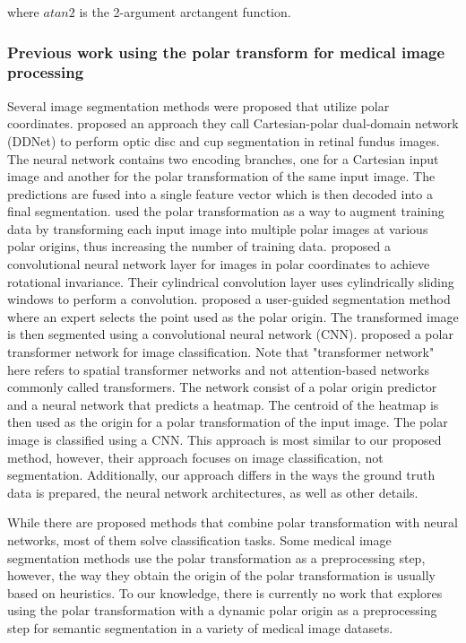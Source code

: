   where $atan2$ is the 2-argument arctangent function.

    \subsubsection{Previous work using the polar transform for medical image processing}
    
Several image segmentation methods were proposed that utilize polar coordinates. 
\citet{liuDDNetCartesianpolarDualdomain2019a} proposed an approach they
call Cartesian-polar dual-domain network (DDNet) to perform optic disc and cup segmentation
in retinal fundus images. The neural network contains two encoding branches, one for a Cartesian input image and another for the polar transformation of the same input image. The predictions are fused into a single feature vector which is then decoded into a final segmentation.
\citet{salehinejadImageAugmentationUsing2018} used the polar transformation as a way to 
augment
training data by transforming each input image into multiple polar images at various polar
origins, thus increasing the number of training data.
\citet{kimCyCNNRotationInvariant2020a} proposed a convolutional neural network layer for 
images in polar 
coordinates to achieve rotational invariance. Their cylindrical convolution layer uses cylindrically sliding windows to perform a convolution.
\citet{kimCNNBasedUGS2018} proposed a user-guided segmentation method where an expert 
selects the
point used as the polar origin. The transformed image is then
segmented using a convolutional neural network (CNN). 
\citet{estevesPolarTransformerNetworks2018a} proposed a polar transformer network for image 
classification. Note that "transformer network" here refers to spatial transformer networks 
\cite{jaderbergSpatialTransformerNetworks2016} and not attention-based networks commonly called 
transformers.
The network 
consist of a polar origin predictor and a neural network that predicts a heatmap. The centroid of the heatmap is then used as the origin for a polar transformation of the input image. The polar image is classified using a CNN. This approach is most similar to our proposed method, 
however, their approach focuses on image classification, not segmentation. Additionally, our approach differs in the ways the ground truth data is prepared, the neural network architectures, as well as other details.

While there are proposed methods that combine polar transformation with neural networks, most of them solve classification tasks. Some medical image segmentation methods use the polar transformation as a preprocessing step, however, the way they obtain the origin of the polar transformation is usually based on heuristics. To our knowledge, there is currently no work that explores using the polar transformation with a dynamic polar origin as a preprocessing step for semantic segmentation in a variety of medical image datasets.

